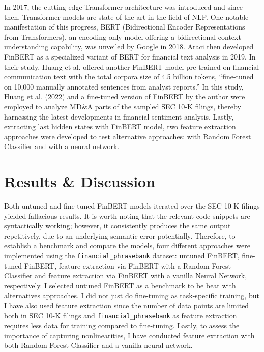 \documentclass{article}
\begin{document}
\noindent In 2017, the cutting-edge Transformer architecture was introduced and since then, Transformer models are state-of-the-art in the field of NLP. One notable manifestation of this progress, BERT (Bidirectional Encoder Representations from Transformers), an encoding-only model offering a bidirectional context understanding capability, was unveiled by Google in 2018. \cite{devlin2018bert} Araci then developed FinBERT as a specialized variant of BERT for financial text analysis in 2019. \cite{araci2019finbert} In their study, Huang et al. offered another FinBERT model pre-trained on financial communication text with the total corpora size of 4.5 billion tokens, ``fine-tuned on 10,000 manually annotated sentences from analyst reports.'' \cite{huang2023finbert} In this study, Huang et al. (2022) and a fine-tuned version of FinBERT by the author were employed to analyze MD\&A parts of the sampled SEC 10-K filings, thereby harnessing the latest developments in financial sentiment analysis. Lastly, extracting last hidden states with FinBERT model, two feature extraction approaches were developed to test alternative approaches: with Random Forest Classifier and with a neural network.

\section{Results \& Discussion}

Both untuned and fine-tuned FinBERT models iterated over the SEC 10-K filings yielded fallacious results. It is worth noting that the relevant code snippets are syntactically working; however, it consistently produces the same output repetitively, due to an underlying semantic error potentially. Therefore, to establish a benchmark and compare the models, four different approaches were implemented using the \texttt{financial\_phrasebank} dataset: untuned FinBERT, fine-tuned FinBERT, feature extraction via FinBERT with a Random Forest Classifier and feature extraction via FinBERT with a vanilla Neural Network, respectively. I selected untuned FinBERT as a benchmark to be beat with alternatives approaches. I did not just do fine-tuning as task-specific training, but I have also used feature extraction since the number of data points are limited both in SEC 10-K filings and \texttt{financial\_phrasebank} as feature extraction requires less data for training compared to fine-tuning. Lastly, to assess the importance of capturing nonlinearities, I have conducted feature extraction with both Random Forest Classifier and a vanilla neural network.
\end{document}
